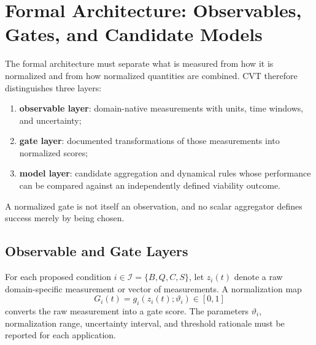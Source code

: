 
\section{Formal Architecture: Observables, Gates, and Candidate Models}
\label{sec:formal}

The formal architecture must separate what is measured from how it is normalized and from how normalized quantities are combined. CVT therefore distinguishes three layers:
\begin{enumerate}[label=(\roman*)]
    \item \textbf{observable layer}: domain-native measurements with units, time windows, and uncertainty;
    \item \textbf{gate layer}: documented transformations of those measurements into normalized scores;
    \item \textbf{model layer}: candidate aggregation and dynamical rules whose performance can be compared against an independently defined viability outcome.
\end{enumerate}
A normalized gate is not itself an observation, and no scalar aggregator defines success merely by being chosen.

\subsection{Observable and Gate Layers}

For each proposed condition \(i\in\mathcal I=\{B,Q,C,S\}\), let \(z_i(t)\) denote a raw domain-specific measurement or vector of measurements. A normalization map
\begin{equation}
    G_i(t)
    =
    g_i\!\left(z_i(t);\vartheta_i\right)
    \in[0,1]
    \label{eq:gate-normalization}
\end{equation}
converts the raw measurement into a gate score. The parameters \(\vartheta_i\), normalization range, uncertainty interval, and threshold rationale must be reported for each application.


